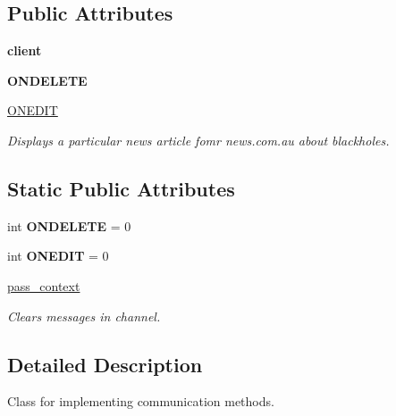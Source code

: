 \subsection*{Public Attributes}
\begin{DoxyCompactItemize}
\item 
\mbox{\label{class_comm_1_1_comm_a1288c91040e03daa2626636f17577c81}} 
{\bfseries client}
\item 
\mbox{\label{class_comm_1_1_comm_aa26d2488dd7ad08946c0d2fa425c01ba}} 
{\bfseries O\+N\+D\+E\+L\+E\+TE}
\item 
\mbox{\label{class_comm_1_1_comm_a5b84ca85af0e2897a145ddf916c0d07c}} 
\mbox{\hyperlink{class_comm_1_1_comm_a5b84ca85af0e2897a145ddf916c0d07c}{O\+N\+E\+D\+IT}}
\begin{DoxyCompactList}\small\item\em Displays a particular news article fomr news.\+com.\+au about blackholes. \end{DoxyCompactList}\end{DoxyCompactItemize}
\subsection*{Static Public Attributes}
\begin{DoxyCompactItemize}
\item 
\mbox{\label{class_comm_1_1_comm_a88815e67cddb63a01efec08751e35425}} 
int {\bfseries O\+N\+D\+E\+L\+E\+TE} = 0
\item 
\mbox{\label{class_comm_1_1_comm_af6f2a8dfc4a209242b9a7ce2f91086cb}} 
int {\bfseries O\+N\+E\+D\+IT} = 0
\item 
\mbox{\hyperlink{class_comm_1_1_comm_a29104131fc8568f962827432fb1bab82}{pass\+\_\+context}}
\begin{DoxyCompactList}\small\item\em Clears messages in channel. \end{DoxyCompactList}\end{DoxyCompactItemize}


\subsection{Detailed Description}
Class for implementing communication methods. 


